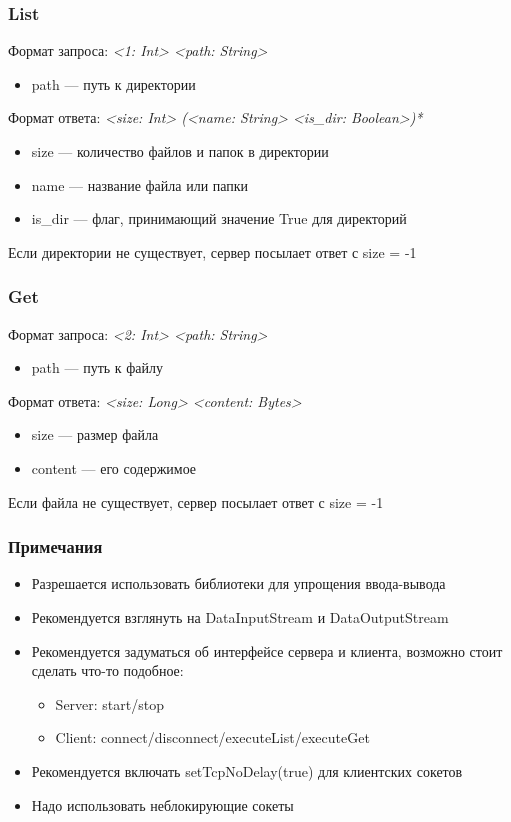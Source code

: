 \documentclass[xetex,mathserif,serif]{beamer}
\begin{document}
	\begin{frame}
		\frametitle{List}
		Формат запроса: \textit{<1: Int> <path: String>}

		\begin{itemize}
			\item path --- путь к директории
		\end{itemize}

		Формат ответа: \textit{<size: Int> (<name: String> <is\_dir: Boolean>)*}

		\begin{itemize}
			\item size --- количество файлов и папок в директории
			\item name --- название файла или папки
			\item is\_dir --- флаг, принимающий значение True для директорий
		\end{itemize}
		Если директории не существует, сервер посылает ответ с size = -1
	\end{frame}

	\begin{frame}
		\frametitle{Get}
		Формат запроса: \textit{<2: Int> <path: String>}
		\begin{itemize}
			\item path --- путь к файлу
		\end{itemize}
		
		Формат ответа: \textit{<size: Long> <content: Bytes>}
		\begin{itemize}
			\item size --- размер файла
			\item content --- его содержимое
		\end{itemize}
		Если файла не существует, сервер посылает ответ с size = -1
	\end{frame}

	\begin{frame}
		\frametitle{Примечания}
		\begin{itemize}
			\item Разрешается использовать библиотеки для упрощения ввода-вывода
			\item Рекомендуется взглянуть на DataInputStream и DataOutputStream
			\item Рекомендуется задуматься об интерфейсе сервера и клиента, возможно стоит сделать что-то подобное:
			\begin{itemize}
				\item Server: start/stop
				\item Client: connect/disconnect/executeList/executeGet
			\end{itemize}
			\item Рекомендуется включать setTcpNoDelay(true) для клиентских сокетов
			\item Надо использовать неблокирующие сокеты
		\end{itemize}
	\end{frame}
\end{document}
